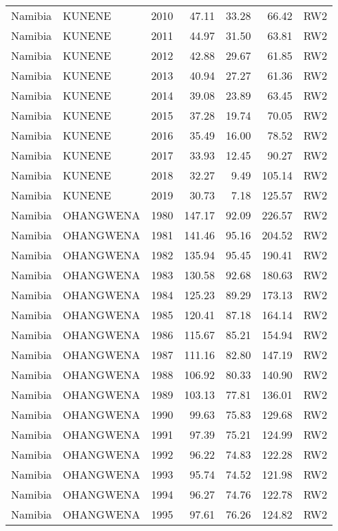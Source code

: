\begin{longtable}{lllrrrl}
  Namibia & KUNENE & 2010 & 47.11 & 33.28 & 66.42 & RW2 \\ 
  Namibia & KUNENE & 2011 & 44.97 & 31.50 & 63.81 & RW2 \\ 
  Namibia & KUNENE & 2012 & 42.88 & 29.67 & 61.85 & RW2 \\ 
  Namibia & KUNENE & 2013 & 40.94 & 27.27 & 61.36 & RW2 \\ 
  Namibia & KUNENE & 2014 & 39.08 & 23.89 & 63.45 & RW2 \\ 
  Namibia & KUNENE & 2015 & 37.28 & 19.74 & 70.05 & RW2 \\ 
  Namibia & KUNENE & 2016 & 35.49 & 16.00 & 78.52 & RW2 \\ 
  Namibia & KUNENE & 2017 & 33.93 & 12.45 & 90.27 & RW2 \\ 
  Namibia & KUNENE & 2018 & 32.27 & 9.49 & 105.14 & RW2 \\ 
  Namibia & KUNENE & 2019 & 30.73 & 7.18 & 125.57 & RW2 \\ 
  Namibia & OHANGWENA & 1980 & 147.17 & 92.09 & 226.57 & RW2 \\ 
  Namibia & OHANGWENA & 1981 & 141.46 & 95.16 & 204.52 & RW2 \\ 
  Namibia & OHANGWENA & 1982 & 135.94 & 95.45 & 190.41 & RW2 \\ 
  Namibia & OHANGWENA & 1983 & 130.58 & 92.68 & 180.63 & RW2 \\ 
  Namibia & OHANGWENA & 1984 & 125.23 & 89.29 & 173.13 & RW2 \\ 
  Namibia & OHANGWENA & 1985 & 120.41 & 87.18 & 164.14 & RW2 \\ 
  Namibia & OHANGWENA & 1986 & 115.67 & 85.21 & 154.94 & RW2 \\ 
  Namibia & OHANGWENA & 1987 & 111.16 & 82.80 & 147.19 & RW2 \\ 
  Namibia & OHANGWENA & 1988 & 106.92 & 80.33 & 140.90 & RW2 \\ 
  Namibia & OHANGWENA & 1989 & 103.13 & 77.81 & 136.01 & RW2 \\ 
  Namibia & OHANGWENA & 1990 & 99.63 & 75.83 & 129.68 & RW2 \\ 
  Namibia & OHANGWENA & 1991 & 97.39 & 75.21 & 124.99 & RW2 \\ 
  Namibia & OHANGWENA & 1992 & 96.22 & 74.83 & 122.28 & RW2 \\ 
  Namibia & OHANGWENA & 1993 & 95.74 & 74.52 & 121.98 & RW2 \\ 
  Namibia & OHANGWENA & 1994 & 96.27 & 74.76 & 122.78 & RW2 \\ 
  Namibia & OHANGWENA & 1995 & 97.61 & 76.26 & 124.82 & RW2 \\ 

\end{longtable}

